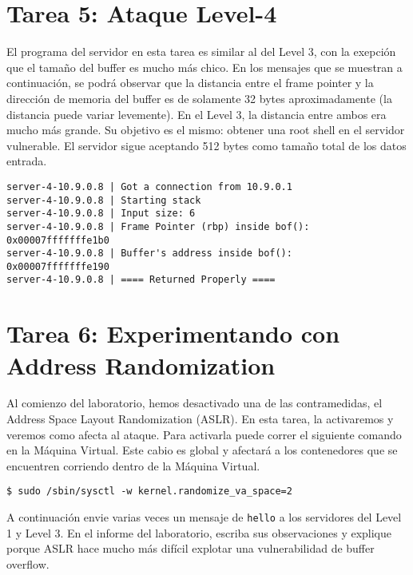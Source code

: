 \section{Tarea 5: Ataque Level-4} 

El programa del servidor en esta tarea es similar al del Level 3, con la exepción que el tamaño del buffer es mucho más chico. En los mensajes que se muestran a continuación, se podrá observar que la distancia entre el frame pointer y la dirección de memoria del buffer es de solamente 32 bytes aproximadamente (la distancia puede variar levemente).
En el Level 3, la distancia entre ambos era mucho más grande. Su objetivo es el mismo: obtener una root shell en el servidor vulnerable. El servidor sigue aceptando 512 bytes como tamaño total de los datos entrada.

\begin{lstlisting}
server-4-10.9.0.8 | Got a connection from 10.9.0.1
server-4-10.9.0.8 | Starting stack
server-4-10.9.0.8 | Input size: 6
server-4-10.9.0.8 | Frame Pointer (rbp) inside bof():  0x00007fffffffe1b0
server-4-10.9.0.8 | Buffer's address inside bof():     0x00007fffffffe190
server-4-10.9.0.8 | ==== Returned Properly ====
\end{lstlisting}
 

\section{Tarea 6: Experimentando con Address Randomization}

Al comienzo del laboratorio, hemos desactivado una de las contramedidas, el Address Space Layout Randomization (ASLR). En esta tarea, la activaremos y veremos como afecta al ataque. Para activarla puede correr el siguiente comando en la Máquina Virtual. Este cabio es global y afectará a los contenedores que se encuentren corriendo dentro de la Máquina Virtual.


\begin{lstlisting}
$ sudo /sbin/sysctl -w kernel.randomize_va_space=2
\end{lstlisting}

A continuación envie varias veces un mensaje de \texttt{hello} a los servidores del Level 1 y Level 3.
En el informe del laboratorio, escriba sus observaciones y explique porque ASLR hace mucho más difícil explotar una vulnerabilidad de buffer overflow.


